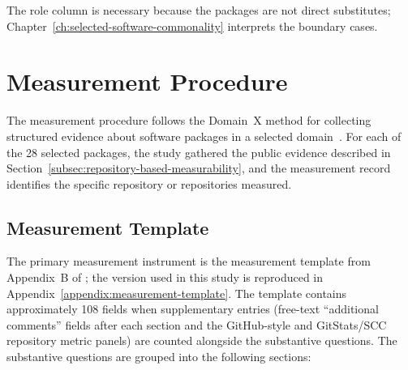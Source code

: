 The role column is necessary because the packages are not direct substitutes; Chapter~\ref{ch:selected-software-commonality} interprets the boundary cases.

\section{Measurement Procedure}
\label{sec:measurement-procedure}

The measurement procedure follows the Domain~X method for collecting structured evidence about software packages in a selected domain~\citep{Smith2021}. For each of the 28 selected packages, the study gathered the public evidence described in Section~\ref{subsec:repository-based-measurability}, and the measurement record identifies the specific repository or repositories measured.

\subsection{Measurement Template}
\label{subsec:measurement-template}

The primary measurement instrument is the measurement template from Appendix~B of \citet{Smith2021}; the version used in this study is reproduced in Appendix~\ref{appendix:measurement-template}. The template contains approximately 108 fields when supplementary entries (free-text ``additional comments'' fields after each section and the GitHub-style and GitStats/SCC repository metric panels) are counted alongside the substantive questions. The substantive questions are grouped into the following sections:

